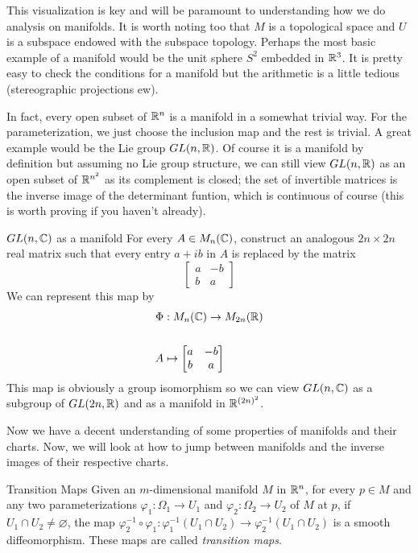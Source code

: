 This visualization is key and will be paramount to understanding how we do analysis
on manifolds. It is worth noting too that $M$ is a topological space and $U$ is a
subspace endowed with the subspace topology. Perhaps the most basic example of a
manifold would be the unit sphere $S^2$ embedded in $\mathbb{R}^3$. It is pretty easy to
check the conditions for a manifold but the arithmetic is a little tedious (stereographic
projections ew).

In fact, every open subset of $\mathbb{R}^n$ is a manifold in a somewhat trivial way. For 
the parameterization, we just choose the inclusion map and the rest is trivial.
A great example would be the Lie group $GL(n,\mathbb{R})$. Of course it is a manifold by
definition but assuming no Lie group structure, we can still view $GL(n,\mathbb{R})$ as an
open subset of $\mathbb{R}^{n^2}$ as its complement is closed; the set of invertible matrices
is the inverse image of the determinant funtion, which is continuous of course (this
is worth proving if you haven't already).

\begin{boxex}{$GL(n,\mathbb{C})$ as a manifold}{}
    For every $A \in M_n(\mathbb{C})$, construct an analogous $2n \times 2n$ real matrix
    such that every entry $a + ib$ in $A$ is replaced by the matrix
    \begin{equation*}
        \begin{bmatrix}
            a & -b\\
            b & a
        \end{bmatrix}
    \end{equation*}
    We can represent this map by
    \begin{align*}
        \Phi &: M_n(\mathbb{C}) \to M_{2n}(\mathbb{R})\\ \\
        A & \mapsto \begin{bmatrix}
            a & -b\\
            b & a
        \end{bmatrix}
    \end{align*}
    This map is obviously a group isomorphism so we can view $GL(n,\mathbb{C})$ as a subgroup
    of $GL(2n,\mathbb{R})$ and as a manifold in $\mathbb{R}^{(2n)^2}$.
\end{boxex}

Now we have a decent understanding of some properties of manifolds and their charts.
Now, we will look at how to jump between manifolds and the inverse images of their
respective charts.

\begin{boxdef}{Transition Maps}{}
    Given an $m$-dimensional manifold $M$ in $\mathbb{R}^n$, for every $p \in M$ and any
    two parameterizations $\varphi_1: \Omega_1 \to U_1$ and $\varphi_2: \Omega_2
    \to U_2$ of $M$ at $p$, if $U_1 \cap U_2 \neq \varnothing$, the map $\varphi_2^{-1}
    \circ \varphi_1 : \varphi_1^{-1}(U_1 \cap U_2) \to \varphi_2^{-1}(U_1 \cap U_2)$
    is a smooth diffeomorphism. These maps are called \textit{transition maps}.     
\end{boxdef}


